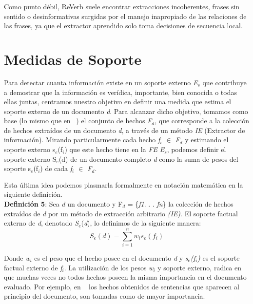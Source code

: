 Como punto d\'ebil, ReVerb suele encontrar extracciones incoherentes, frases sin sentido o desinformativas surgidas por el manejo inapropiado de las relaciones de las frases, ya que el extractor aprendido solo toma decisiones de secuencia local.

\section{Medidas de Soporte}
Para detectar cuanta informaci\'on existe en un soporte externo \emph{E${_s}$} que contribuye a demostrar que la informaci\'on es ver\'idica, importante, bien conocida o todas ellas juntas, centramos nuestro objetivo en definir una medida que estima el soporte externo de un documento \textit{d}. Para alcanzar dicho objetivo, tomamos como base (lo mismo que en ~\cite{LeVoErFeCaHoGrr:12}) el conjunto de hechos \emph{F${_d}$}, que corresponde a la colecci\'on de hechos extra\'idos de un documento  \textit{d}, a trav\'es de un m\'etodo \emph{IE} (Extractor de informaci\'on).
Mirando particularmente cada hecho \emph{f${_i}$ $\in$ F${_d}$} y estimando el soporte externo s${_e}$(f${_i}$) que este hecho tiene en la \emph{FE} \emph{E${_s}$}, podemos definir el soporte externo S${_e}$(d) de un documento completo \textit{d} como la suma de pesos del soporte s${_e}$(f${_i}$) de cada \emph{f${_i}$ $\in$ F${_d}$}.

Esta \'ultima idea podemos plasmarla formalmente en notaci\'on matem\'atica en la siguiente definici\'on.\\

\textbf{Definici\'on 5}: Sea \emph{d} un documento y F${_d}$ = \{\textit{f1}. . . \textit{fn}\} la colecci\'on de hechos extra\'idos de \emph{d} por un m\'etodo de extracci\'on arbitrario \emph{(IE)}. El soporte factual externo de \textit{d}, denotado \emph{S${_e}$}(\emph{d}), lo definimos de la siguiente manera:\\

\begin{equation}
 \label{eq:ec1}
S{_e}(d) =  \sum_{i=1}^{n}w_{i} s_{e}(f_{i})
\end{equation}

Donde \emph{w${_i}$} es el peso que el hecho posee en el documento \textit{d} y \emph{s${_e}$(f${_i}$)} es el soporte factual externo de \emph{f${_i}$}.
La utilizaci\'on de los pesos \emph{w${_i}$} y soporte externo, radica en que muchas veces no todos hechos poseen la misma importancia en el documento evaluado. Por ejemplo, en ~\cite{MaWa:10} los hechos obtenidos de sentencias que aparecen al principio del documento, son tomadas como de mayor importancia.

